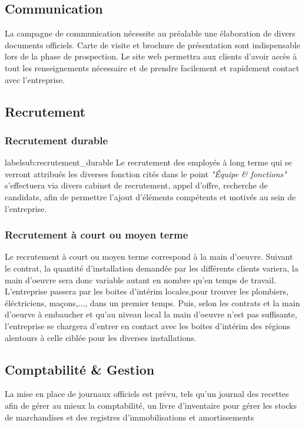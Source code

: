 \documentclass[11pt]{article}
\begin{document}

\subsection{Communication}
\label{sub:communication}
La campagne de communication nécessite au préalable une élaboration de divers documents officiels. Carte de visite et brochure de présentation sont indispensable lors de la phase de prospection. Le site web permettra aux clients d'avoir accès à tout les renseignements nécessaire et de prendre facilement et rapidement contact avec l'entreprise.

\subsection{Recrutement}
\label{sub:recrutement}
\subsubsection{Recrutement durable}
label{sub:recrutement_durable}
Le recrutement des employés à long terme qui se verront attribués les diverses fonction cités dans le point \emph{"Équipe \& fonctions"} s'effectuera via divers cabinet de recrutement, appel d'offre, recherche de candidats, afin de permettre l'ajout d'éléments compétents et motivés au sein de l'entreprise.

\subsubsection{Recrutement à court ou moyen terme}
\label{sub:recrutement_court_moyen_terme}
Le recrutement à court ou moyen terme correspond à la main d'oeuvre. Suivant le contrat, la quantité d'installation demandée par les différents clients variera, la main d'oeuvre sera donc variable autant en nombre qu'en temps de travail.
L'entreprise passera par les boites d'intérim locales,pour trouver les plombiers, éléctriciens, maçons,..., dans un premier temps. Puis, selon les contrats et la main d'oeurve à embaucher et qu'au niveau local la main d'oeuvre n'est pas suffisante, l'entreprise se chargera d'entrer en contact avec les boites d'intérim des régions alentours à celle ciblée pour les diverses installations.


\subsection{Comptabilité \& Gestion}
\label{sub:comptabilité_gestion}
La mise en place de journaux officiels est prévu, tels qu'un journal des recettes afin de gérer au mieux la comptabilité, un livre d'inventaire pour gérer les stocks de marchandises et des registres d'immobilisations et amortissements
\end{document}
